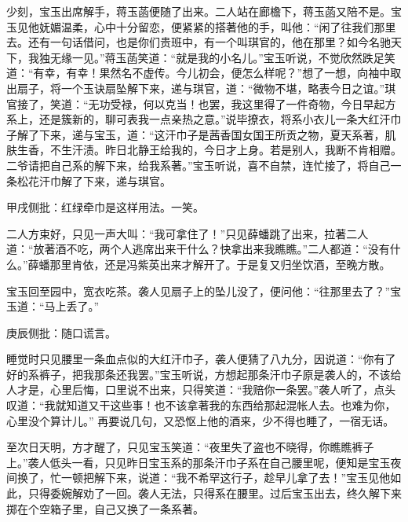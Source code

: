 \begin{parag}
    少刻，宝玉出席解手，蒋玉菡便随了出来。二人站在廊檐下，蒋玉菡又陪不是。宝玉见他妩媚温柔，心中十分留恋，便紧紧的搭著他的手，叫他：“闲了往我们那里去。还有一句话借问，也是你们贵班中，有一个叫琪官的，他在那里？如今名驰天下，我独无缘一见。”蒋玉菡笑道：“就是我的小名儿。”宝玉听说，不觉欣然跌足笑道：“有幸，有幸！果然名不虚传。今儿初会，便怎么样呢？”想了一想，向袖中取出扇子，将一个玉诀扇坠解下来，递与琪官，道：“微物不堪，略表今日之谊。”琪官接了，笑道：“无功受禄，何以克当！也罢，我这里得了一件奇物，今日早起方系上，还是簇新的，聊可表我一点亲热之意。”说毕撩衣，将系小衣儿一条大红汗巾子解了下来，递与宝玉，道：“这汗巾子是茜香国女国王所贡之物，夏天系著，肌肤生香，不生汗渍。昨日北静王给我的，今日才上身。若是别人，我断不肯相赠。二爷请把自己系的解下来，给我系著。”宝玉听说，喜不自禁，连忙接了，将自己一条松花汗巾解了下来，递与琪官。\begin{note}甲戌侧批：红绿牵巾是这样用法。一笑。\end{note}二人方束好，只见一声大叫：“我可拿住了！”只见薛蟠跳了出来，拉著二人道：“放著酒不吃，两个人逃席出来干什么？快拿出来我瞧瞧。”二人都道：“没有什么。”薛蟠那里肯依，还是冯紫英出来才解开了。于是复又归坐饮酒，至晚方散。
\end{parag}


\begin{parag}
    宝玉回至园中，宽衣吃茶。袭人见扇子上的坠儿没了，便问他：“往那里去了？”宝玉道：“马上丢了。”\begin{note}庚辰侧批：随口谎言。\end{note}睡觉时只见腰里一条血点似的大红汗巾子，袭人便猜了八九分，因说道：“你有了好的系裤子，把我那条还我罢。”宝玉听说，方想起那条汗巾子原是袭人的，不该给人才是，心里后悔，口里说不出来，只得笑道：“我赔你一条罢。”袭人听了，点头叹道：“我就知道又干这些事！也不该拿著我的东西给那起混帐人去。也难为你，心里没个算计儿。” 再要说几句，又恐怄上他的酒来，少不得也睡了，一宿无话。
\end{parag}


\begin{parag}
    至次日天明，方才醒了，只见宝玉笑道：“夜里失了盗也不晓得，你瞧瞧裤子上。”袭人低头一看，只见昨日宝玉系的那条汗巾子系在自己腰里呢，便知是宝玉夜间换了，忙一顿把解下来，说道：“我不希罕这行子，趁早儿拿了去！”宝玉见他如此，只得委婉解劝了一回。袭人无法，只得系在腰里。过后宝玉出去，终久解下来掷在个空箱子里，自己又换了一条系著。
\end{parag}


